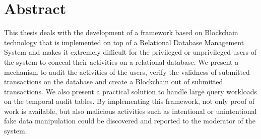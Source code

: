 \chapter*{Abstract}

 This thesis deals with the development of a framework based on Blockchain technology that is implemented on top of a Relational Database Management System and makes it extremely difficult for the privileged or unprivileged users of the system to conceal their activities on a relational database. We present a mechanism to audit the activities of the users, verify the validness of submitted transactions on the database and create a Blockchain out of submitted transactions. We also present a practical solution to handle large query workloads on the temporal audit tables. By implementing this framework, not only proof of work is available, but also malicious activities such as intentional or unintentional fake data manipulation could be discovered and reported to the moderator of the system.

